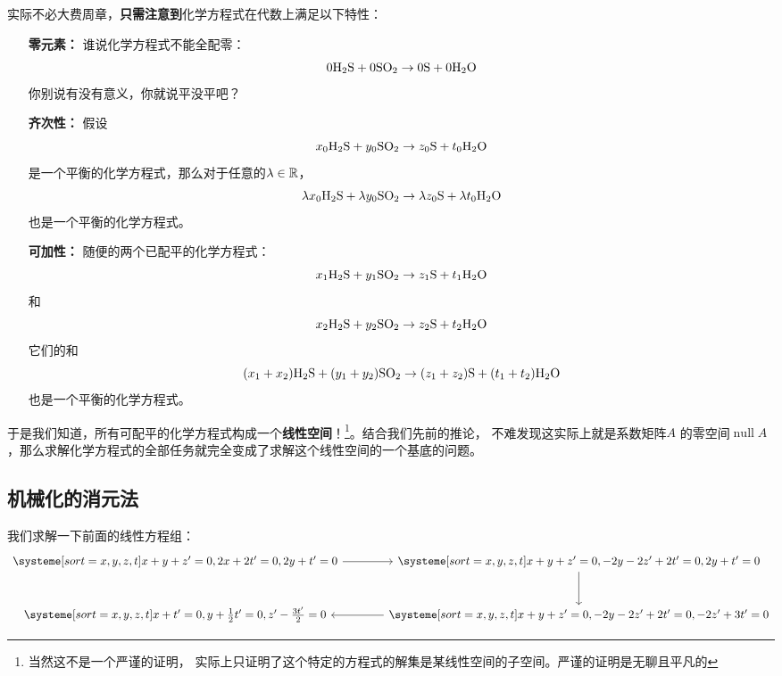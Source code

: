 \documentclass{ctexart}
\DeclareMathOperator{\nullspace}{null}
\begin{document}
实际不必大费周章，\textbf{只需注意到}化学方程式在代数上满足以下特性：
\begin{itemize}
    \item[\textbf{零元素：}] 谁说化学方程式不能全配零：\[
            0 \ce{H2S} + 0 \ce{SO2} \to 0 \ce{S} + 0 \ce{H2O}
        \]
        你别说有没有意义，你就说平没平吧？
    \item[\textbf{齐次性：}] 假设\[
            x_0 \ce{H2S} + y_0 \ce{SO2} \to z_0 \ce{S} + t_0 \ce{H2O}
        \]
        是一个平衡的化学方程式，那么对于任意的\(\lambda \in \mathbb{R}\)，
        \[
            \lambda x_0 \ce{H2S} + \lambda y_0 \ce{SO2} \to
            \lambda z_0 \ce{S} + \lambda t_0 \ce{H2O}
        \]
        也是一个平衡的化学方程式。
    \item[\textbf{可加性：}] 随便的两个已配平的化学方程式：\[
            x_1 \ce{H2S} + y_1 \ce{SO2} \to z_1 \ce{S} + t_1 \ce{H2O}
        \]
        和
        \[
            x_2 \ce{H2S} + y_2 \ce{SO2} \to z_2 \ce{S} + t_2 \ce{H2O}
        \]
        它们的和
        \[
            (x_1 + x_2) \ce{H2S} + (y_1 + y_2) \ce{SO2} \to
            (z_1 + z_2) \ce{S} + (t_1 + t_2) \ce{H2O}
        \]
        也是一个平衡的化学方程式。
\end{itemize}

于是我们知道，所有可配平的化学方程式构成一个\textbf{线性空间}！\footnote{当然这不是一个严谨的证明，
实际上只证明了这个特定的方程式的解集是某线性空间的子空间。严谨的证明是无聊且平凡的}。结合我们先前的推论，
不难发现这实际上就是系数矩阵\(A\) 的零空间\(\nullspace A\) ，那么求解化学方程式的全部任务就完全变成了求解这个线性空间的一个基底的问题。

\subsection{机械化的消元法}
我们求解一下前面的线性方程组：
\[
    \begin{tikzcd}[column sep=large, row sep=large]
        \systeme[sort={x, y, z, t}]{
            x + y + z^{\prime} = 0,
            2x + 2t^{\prime} = 0,
            2y + t^{\prime} = 0
        }
        \arrow[r] &
        \systeme[sort={x, y, z, t}]{
            x + y + z^{\prime} = 0,
            -2y - 2z^{\prime} + 2t^{\prime} = 0,
            2y +t^{\prime} = 0
        }
        \arrow[d] \\
        \systeme[sort={x, y, z, t}]{
            x + t^{\prime} = 0,
            y + \frac{1}{2}t^{\prime} = 0,
            z^{\prime} - \frac{3t^{\prime}}{2} = 0
        } &
        \systeme[sort={x, y, z, t}]{
            x + y + z^{\prime} = 0,
            -2y -2z^{\prime} + 2t^{\prime} = 0,
            -2z^{\prime} + 3t^{\prime} = 0
        }
        \arrow[l]
    \end{tikzcd}
\]
\end{document}
